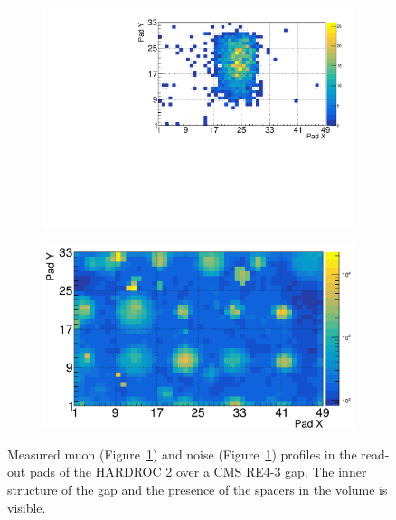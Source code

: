 	\begin{figure}[H]
		\begin{subfigure}{.5\linewidth}
		    \centering
			\includegraphics[width = \linewidth]{fig/chapt6/Muon-Profile-RE4-HARDROC.pdf}
			\caption{\label{fig:HARDROC2-profiles:A}}
		\end{subfigure}
		\begin{subfigure}{.5\linewidth}
		    \centering
			\includegraphics[width = \linewidth]{fig/chapt6/Noise-Profile-RE4-HARDROC.pdf}
			\caption{\label{fig:HARDROC2-profiles:B}}
		\end{subfigure}
		\caption{\label{fig:HARDROC2-profiles} Measured muon (Figure~\ref{fig:HARDROC2-profiles:A}) and noise (Figure~\ref{fig:HARDROC2-profiles:A}) profiles in the read-out pads of the HARDROC 2 over a CMS RE4-3 gap. The inner structure of the gap and the presence of the spacers in the volume is visible.}
    \end{figure}
	
